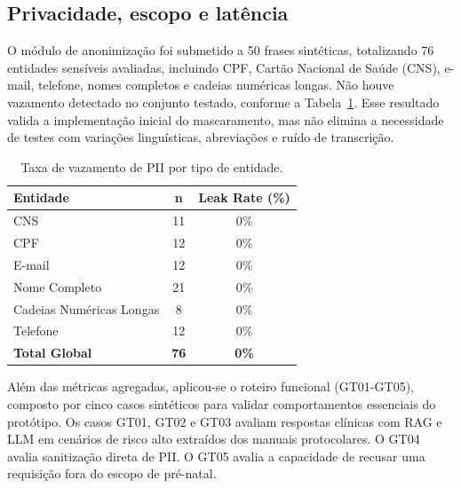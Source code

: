 \documentclass[12pt]{article}
\begin{document}

\subsection{Privacidade, escopo e latência}

O módulo de anonimização foi submetido a 50 frases sintéticas, totalizando 76 entidades sensíveis avaliadas, incluindo CPF, Cartão Nacional de Saúde (CNS), e-mail, telefone, nomes completos e cadeias numéricas longas.
Não houve vazamento detectado no conjunto testado, conforme a Tabela~\ref{tab:pii_leak}. Esse resultado valida a implementação inicial do mascaramento, mas não elimina a necessidade de testes com variações linguísticas, abreviações e ruído de transcrição.

\begin{table}[H]
  \centering
  \caption{Taxa de vazamento de PII por tipo de entidade.}
  \label{tab:pii_leak}
  \small
  \begin{tabular}{lcc}
  	\toprule
	\textbf{Entidade} 	 	                & \textbf{n} 		                & \textbf{Leak Rate (\%)} \\
	\midrule
  	CNS     			                      & 11                            & 0\%                   \\
  	CPF                                 & 12                            & 0\%                   \\
  	E-mail                              & 12                            & 0\%                   \\
  	Nome Completo			                  & 21                            & 0\%                   \\
  	Cadeias Numéricas Longas            & 8                             & 0\%                   \\
  	Telefone                            & 12                            & 0\%                   \\
	\midrule
  	\textbf{Total Global}               & \textbf{76}                   & \textbf{0\%}          \\
  	\bottomrule
  \end{tabular}
  \end{table}
 
Além das métricas agregadas, aplicou-se o roteiro funcional (GT01-GT05), composto por cinco casos sintéticos para validar comportamentos essenciais do protótipo.
Os casos GT01, GT02 e GT03 avaliam respostas clínicas com RAG e LLM em cenários de risco alto extraídos dos manuais protocolares.
O GT04 avalia sanitização direta de PII.
O GT05 avalia a capacidade de recusar uma requisição fora do escopo de pré-natal.
\end{document}
